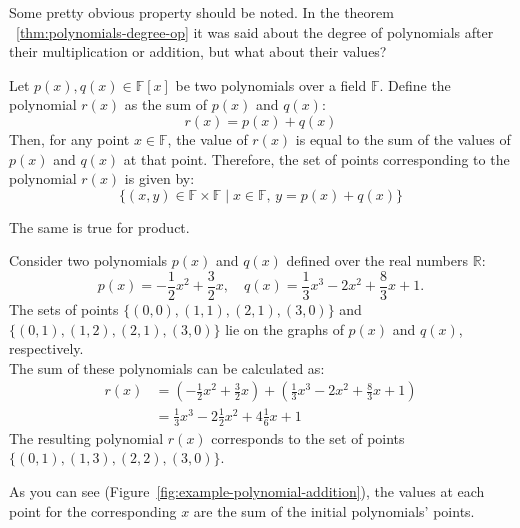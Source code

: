 \documentclass[../lecture-notes.tex]{subfiles}
\begin{document}
\begin{remark}
    Some pretty obvious property should be noted. In the theorem ~\ref{thm:polynomials-degree-op}
    it was said about the degree of polynomials after their multiplication or addition, but what
    about their values?

    Let $p(x), q(x) \in \mathbb{F}[x]$ be two polynomials over a field $\mathbb{F}$. Define the 
    polynomial $r(x)$ as the sum of $p(x)$ and $q(x)$:
    \begin{equation*}
        r(x) = p(x) + q(x)
    \end{equation*}
    Then, for any point $x \in \mathbb{F}$, the value of $r(x)$ is equal to the sum of the
    values of $p(x)$ and $q(x)$ at that point. Therefore, the set of points corresponding to the 
    polynomial $r(x)$ is given by:
    \begin{equation*}
        \{(x, y) \in \mathbb{F} \times \mathbb{F} \mid x \in \mathbb{F}, \, y = p(x) + q(x) \}
    \end{equation*}

    The same is true for product.
\end{remark}

\begin{example}
    Consider two polynomials $p(x)$ and $q(x)$ defined over the real numbers $\mathbb{R}$:
    \begin{equation*}
        p(x) = -\frac{1}{2}x^2 + \frac{3}{2}x, \quad
        q(x) = \frac{1}{3}x^3 - 2x^2 + \frac{8}{3}x + 1.
    \end{equation*}
    The sets of points $\{(0, 0), (1, 1), (2, 1), (3, 0)\}$ and $\{(0, 1), (1, 2), (2, 1), (3, 0)\}$
    lie on the graphs of $p(x)$ and $q(x)$, respectively.\\
    
    The sum of these polynomials can be calculated as:
    \begin{align*}
        r(x) &= (-\frac{1}{2}x^2 + \frac{3}{2}x) + (\frac{1}{3}x^3 - 2x^2 + \frac{8}{3}x + 1) \\
             &= \frac{1}{3}x^3 - 2\frac{1}{2}x^2 + 4\frac{1}{6}x + 1
    \end{align*}
    The resulting polynomial $r(x)$ corresponds to the set of points $\{(0, 1), (1, 3), (2, 2), (3, 0)\}$.
    
    As you can see (Figure~\ref{fig:example-polynomial-addition}), the values at each point for the 
    corresponding $x$ are the sum of the initial polynomials' points.
\end{example}
\end{document}
